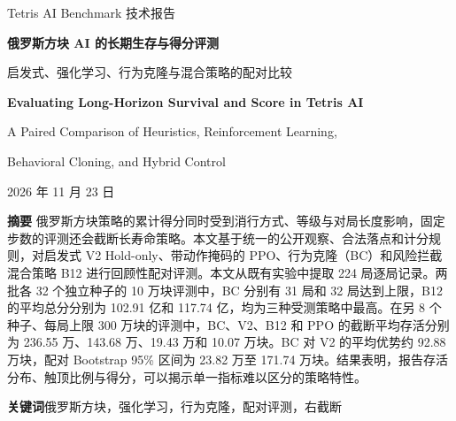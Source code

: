 \documentclass[UTF8,fontset=none,zihao=-4,a4paper]{ctexart}
\newcommand{\1}{\mathbf{1}}
\begin{document}
\begin{center}
  {\small\sffamily Tetris AI Benchmark 技术报告\par}
  \vspace{0.6em}
  {\bfseries 俄罗斯方块 AI 的长期生存与得分评测\par}
  \vspace{0.35em}
  { 启发式、强化学习、行为克隆与混合策略的配对比较\par}
  \vspace{0.65em}
  {\large\bfseries Evaluating Long-Horizon Survival and Score in Tetris AI\par}
  \vspace{0.2em}
  {A Paired Comparison of Heuristics, Reinforcement Learning,\par
   Behavioral Cloning, and Hybrid Control\par}
  \vspace{0.55em}
  {\small 2026 年 11 月 23 日\par}
\end{center}

\noindent\textbf{摘\quad 要}\quad
俄罗斯方块策略的累计得分同时受到消行方式、等级与对局长度影响，固定步数的评测还会截断长寿命策略。本文基于统一的公开观察、合法落点和计分规则，对启发式 V2 Hold-only、带动作掩码的 PPO、行为克隆（BC）和风险拦截混合策略 B12 进行回顾性配对评测。本文从既有实验中提取 224 局逐局记录。两批各 32 个独立种子的 10 万块评测中，BC 分别有 31 局和 32 局达到上限，B12 的平均总分分别为 102.91 亿和 117.74 亿，均为三种受测策略中最高。在另 8 个种子、每局上限 300 万块的评测中，BC、V2、B12 和 PPO 的截断平均存活分别为 236.55 万、143.68 万、19.43 万和 10.07 万块。BC 对 V2 的平均优势约 92.88 万块，配对 Bootstrap 95\% 区间为 23.82 万至 171.74 万块。结果表明，报告存活分布、触顶比例与得分，可以揭示单一指标难以区分的策略特性。

\smallskip
\noindent\textbf{关键词}\quad 俄罗斯方块，强化学习，行为克隆，配对评测，右截断
\end{document}
